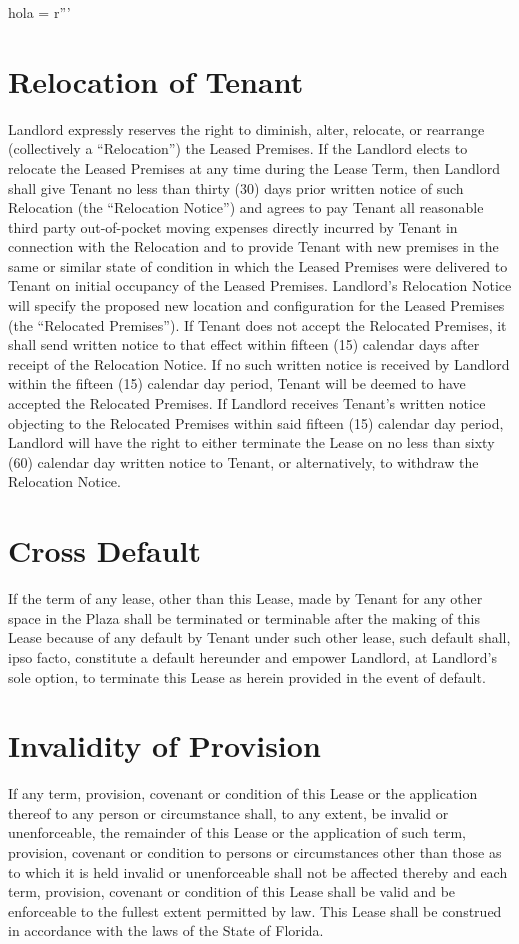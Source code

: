hola = r'''\documentclass{article}
\begin{document}
\section{Relocation of Tenant}
    Landlord expressly reserves the right to diminish, alter, relocate, or rearrange (collectively a ``Relocation'') the Leased Premises.  If the Landlord elects to relocate the Leased Premises at any time during the Lease Term, then Landlord shall give Tenant no less than thirty (30) days prior written notice of such Relocation (the ``Relocation Notice'') and agrees to pay Tenant all reasonable third party out-of-pocket moving expenses directly incurred by Tenant in connection with the Relocation and to provide Tenant with new premises in the same or similar state of condition in which the Leased Premises were delivered to Tenant on initial occupancy of the Leased Premises.  Landlord's Relocation Notice will specify the proposed new location and configuration for the Leased Premises (the ``Relocated Premises'').  If Tenant does not accept the Relocated Premises, it shall send written notice to that effect within fifteen (15) calendar days after receipt of the Relocation Notice.  If no such written notice is received by Landlord within the fifteen (15) calendar day period, Tenant will be deemed to have accepted the Relocated Premises.  If Landlord receives Tenant's written notice objecting to the Relocated Premises within said fifteen (15) calendar day period, Landlord will have the right to either terminate the Lease on no less than sixty (60) calendar day written notice to Tenant, or alternatively, to withdraw the Relocation Notice. 

\section{Cross Default}
    If the term of any lease, other than this Lease, made by Tenant for any other space in the Plaza shall be terminated or terminable after the making of this Lease because of any default by Tenant under such other lease, such default shall, ipso facto, constitute a default hereunder and empower Landlord, at Landlord's sole option, to terminate this Lease as herein provided in the event of default.

\section{Invalidity of Provision}
    If any term, provision, covenant or condition of this Lease or the application thereof to any person or circumstance shall, to any extent, be invalid or unenforceable, the remainder of this Lease or the application of such term, provision, covenant or condition to persons or circumstances other than those as to which it is held invalid or unenforceable shall not be affected thereby and each term, provision, covenant or condition of this Lease shall be valid and be enforceable to the fullest extent permitted by law. This Lease shall be construed in accordance with the laws of the State of Florida.
\end{document}
